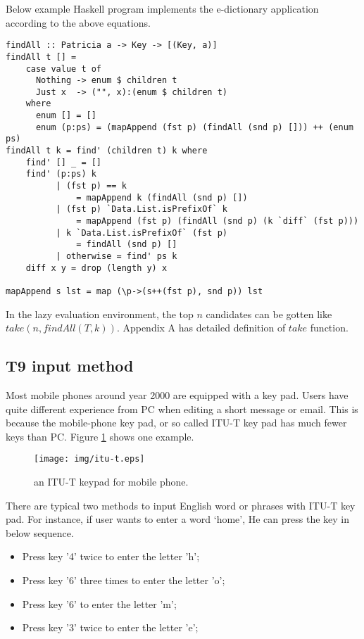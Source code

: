 \documentclass{article}
\begin{document}
Below example Haskell program implements the e-dictionary application
according to the above equations.

\lstset{language=Haskell}
\begin{lstlisting}
findAll :: Patricia a -> Key -> [(Key, a)]
findAll t [] =
    case value t of
      Nothing -> enum $ children t
      Just x  -> ("", x):(enum $ children t)
    where
      enum [] = []
      enum (p:ps) = (mapAppend (fst p) (findAll (snd p) [])) ++ (enum ps)
findAll t k = find' (children t) k where
    find' [] _ = []
    find' (p:ps) k
          | (fst p) == k
              = mapAppend k (findAll (snd p) [])
          | (fst p) `Data.List.isPrefixOf` k
              = mapAppend (fst p) (findAll (snd p) (k `diff` (fst p)))
          | k `Data.List.isPrefixOf` (fst p)
              = findAll (snd p) []
          | otherwise = find' ps k
    diff x y = drop (length y) x

mapAppend s lst = map (\p->(s++(fst p), snd p)) lst
\end{lstlisting}

In the lazy evaluation environment, the top $n$ candidates can be
gotten like $take(n, findAll(T, k))$. Appendix A has detailed definition
of $take$ function.


\subsection{T9 input method}

Most mobile phones around year 2000 are equipped with a key pad.
Users have quite different experience from PC when editing a short message
or email.
This is because the mobile-phone key pad, or so called ITU-T key pad has much fewer
keys than PC. Figure \ref{fig:itut-keypad} shows one example.

\begin{figure}[htbp]
  \centering
  \texttt{[image: img/itu-t.eps]}
  \caption{an ITU-T keypad for mobile phone.}
  \label{fig:itut-keypad}
\end{figure}

There are typical two methods to input English word or phrases with ITU-T key pad.
For instance, if user wants to enter a word `home', He can press the key
in below sequence.

\begin{itemize}
\item Press key '4' twice to enter the letter 'h';
\item Press key '6' three times to enter the letter 'o';
\item Press key '6' to enter the letter 'm';
\item Press key '3' twice to enter the letter 'e';
\end{itemize}
\end{document}
